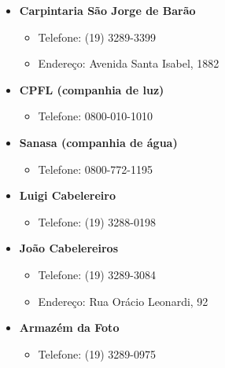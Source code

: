 \begin{itemize}
\item  \textbf{Carpintaria São Jorge de Barão}
\begin{itemize}
\item  Telefone: (19) 3289-3399
\item  Endereço: Avenida Santa Isabel, 1882
\end{itemize}
\end{itemize}

\begin{itemize}
\item  \textbf{CPFL (companhia de luz)}
\begin{itemize}
\item  Telefone: 0800-010-1010
\end{itemize}
\end{itemize}

\begin{itemize}
\item  \textbf{Sanasa (companhia de água)}
\begin{itemize}
\item  Telefone: 0800-772-1195
\end{itemize}
\end{itemize}

\begin{itemize}
\item  \textbf{Luigi Cabelereiro}
\begin{itemize}
\item  Telefone: (19) 3288-0198
\end{itemize}
\end{itemize}

\begin{itemize}
\item  \textbf{João Cabelereiros}
\begin{itemize}
\item  Telefone: (19) 3289-3084
\item  Endereço: Rua Orácio Leonardi, 92
\end{itemize}
\end{itemize}

\begin{itemize}
\item  \textbf{Armazém da Foto}
\begin{itemize}
\item  Telefone: (19) 3289-0975
\end{itemize}
\end{itemize}

